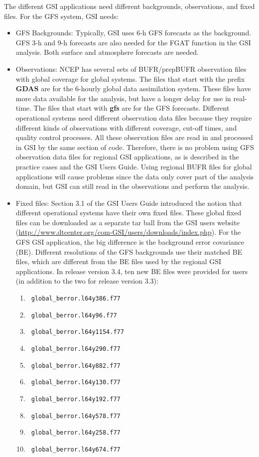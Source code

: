 The different GSI applications need different backgrounds, observations, and fixed files. For the GFS system, GSI needs:

\begin{itemize}
\item GFS Backgrounds: Typically, GSI uses 6-h GFS forecasts as the background. GFS 3-h and 9-h forecasts are also needed for the FGAT function in 
the GSI analysis. Both surface and atmosphere forecasts are needed.
\item Observations: NCEP has several sets of BUFR/prepBUFR observation files with global coverage for global systems. The files that start with the 
prefix \textbf{GDAS} are for the 6-hourly global data assimilation system. These files have more data available for the analysis, but have a longer delay 
for use in real-time. The files that start with \textbf{gfs} are for the GFS forecasts. Different operational systems need different observation data files because they require different kinds of observations with different coverage, cut-off times, and quality control processes. All these observation 
files are read in and processed in GSI by the same section of code. Therefore, there is no problem using GFS observation data files for regional GSI 
applications, as is described in the practice cases and the GSI User\textquotesingle s Guide. Using regional BUFR files for global applications will cause 
problems since the data only cover part of the analysis domain, but GSI can still read in the observations and perform the analysis.
\item Fixed files: Section 3.1 of the GSI User\textquotesingle s Guide introduced the notion that different operational systems have their own fixed files. 
These global fixed files can be downloaded as a separate tar ball from the GSI user\textquotesingle s website 
(\url{http://www.dtcenter.org/com-GSI/users/downloads/index.php}). For the GFS GSI application, the big difference is the background error covariance (BE). 
Different resolutions of the GFS backgrounds use their matched BE files, which are different from the BE files used by the regional GSI applications. In 
release version 3.4, ten new BE files were provided for users (in addition to the two for release version 3.3): \\
\begin{enumerate}
\item \verb| global_berror.l64y386.f77  |
\item \verb| global_berror.l64y96.f77  |
\item \verb| global_berror.l64y1154.f77 |	
\item \verb| global_berror.l64y290.f77 |	
\item \verb| global_berror.l64y882.f77 |
\item \verb| global_berror.l64y130.f77 |		
\item \verb| global_berror.l64y192.f77 |	
\item \verb| global_berror.l64y578.f77 |
\item \verb| global_berror.l64y258.f77 |	
\item \verb| global_berror.l64y674.f77 |
\end{enumerate}
\end{itemize}

